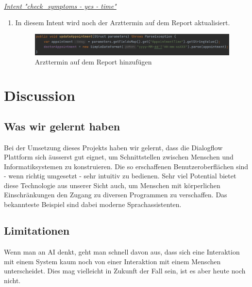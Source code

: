 \documentclass[11pt,a4paper]{article}
\begin{document}
		\underline{\emph{Intent "check\_symptoms - yes - time"}} \\
		\begin{enumerate}
			\item In diesem Intent wird noch der Arzttermin auf dem Report aktualisiert.
			\begin{figure}[h!]
				\begin{center}
            		\includegraphics[width=1.0\linewidth]{JavaClient-UpdateAppointment.png}
					\caption{Arzttermin auf dem Report hinzufügen}
					\label{fig:javaClient_updateAppointment}
				\end{center}
			\end{figure}
		\end{enumerate}
	        
\newpage

\section{Discussion}
    \subsection{Was wir gelernt haben}
        \paragraph{}
            Bei der Umsetzung dieses Projekts haben wir gelernt, dass die Dialogflow Plattform sich äusserst gut eignet, um Schnittstellen
            zwischen Menschen und Informatiksystemen zu konstruieren. Die so erschaffenen Benutzeroberflächen sind - wenn richtig umgesetzt -
            sehr intuitiv zu bedienen. Sehr viel Potential bietet diese Technologie aus unserer Sicht auch, um Menschen mit körperlichen
            Einschränkungen den Zugang zu diversen Programmen zu verschaffen. Das bekannteste Beispiel sind dabei moderne Sprachassistenten.
            
    \subsection{Limitationen}
        \paragraph{}
            Wenn man an AI denkt, geht man schnell davon aus, dass sich eine Interaktion mit einem System kaum noch von einer Interaktion 
            mit einem Menschen unterscheidet. Dies mag vielleicht in Zukunft der Fall sein, ist es aber heute noch nicht.
            
\end{document}
